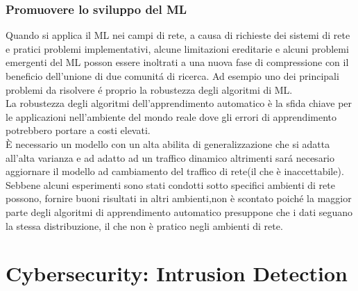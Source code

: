 \documentclass[../tesi.tex]{subfiles}
\begin{document}
\subsubsection{Promuovere lo sviluppo del ML}

Quando si applica il ML nei campi di rete, a causa di richieste dei sistemi di rete e pratici problemi implementativi, alcune limitazioni ereditarie e alcuni problemi emergenti del ML posson essere inoltrati a una nuova fase di compressione con il beneficio dell’unione di due comunitá di ricerca.
Ad esempio uno dei principali problemi da risolvere é proprio la robustezza degli algoritmi di ML.\\ 
La robustezza degli algoritmi dell’apprendimento automatico è la sfida chiave per le applicazioni nell’ambiente del mondo reale dove gli errori di apprendimento potrebbero portare a costi elevati.\\
È necessario un modello con un alta abilita di generalizzazione che si adatta all’alta varianza e ad adatto ad un traffico dinamico altrimenti sará necesario aggiornare il modello ad cambiamento del traffico di rete(il che è inaccettabile).\\
Sebbene alcuni esperimenti sono stati condotti sotto specifici ambienti di rete possono, fornire buoni risultati in altri ambienti,non è scontato poiché la maggior parte degli algoritmi di apprendimento automatico presuppone che i dati seguano la stessa distribuzione, il che non è pratico negli ambienti di rete.

\newpage
\section{Cybersecurity: Intrusion Detection}
\end{document}
